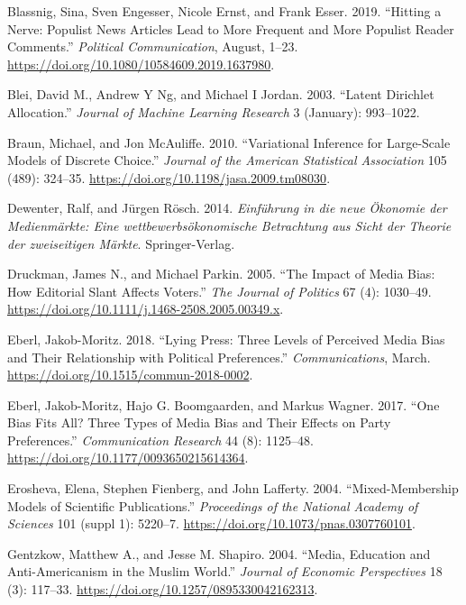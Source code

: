 \documentclass[
]{article}
\begin{document}
\leavevmode\hypertarget{ref-blassnig_hitting_2019}{}%
Blassnig, Sina, Sven Engesser, Nicole Ernst, and Frank Esser. 2019.
``Hitting a Nerve: Populist News Articles Lead to More Frequent and More
Populist Reader Comments.'' \emph{Political Communication}, August,
1--23. \url{https://doi.org/10.1080/10584609.2019.1637980}.

\leavevmode\hypertarget{ref-blei_latent_2003}{}%
Blei, David M., Andrew Y Ng, and Michael I Jordan. 2003. ``Latent
Dirichlet Allocation.'' \emph{Journal of Machine Learning Research} 3
(January): 993--1022.

\leavevmode\hypertarget{ref-braun_variational_2010}{}%
Braun, Michael, and Jon McAuliffe. 2010. ``Variational Inference for
Large-Scale Models of Discrete Choice.'' \emph{Journal of the American
Statistical Association} 105 (489): 324--35.
\url{https://doi.org/10.1198/jasa.2009.tm08030}.

\leavevmode\hypertarget{ref-dewenter_einfuhrung_2014}{}%
Dewenter, Ralf, and Jürgen Rösch. 2014. \emph{Einführung in die neue
Ökonomie der Medienmärkte: Eine wettbewerbsökonomische Betrachtung aus
Sicht der Theorie der zweiseitigen Märkte}. Springer-Verlag.

\leavevmode\hypertarget{ref-druckman_impact_2005}{}%
Druckman, James N., and Michael Parkin. 2005. ``The Impact of Media
Bias: How Editorial Slant Affects Voters.'' \emph{The Journal of
Politics} 67 (4): 1030--49.
\url{https://doi.org/10.1111/j.1468-2508.2005.00349.x}.

\leavevmode\hypertarget{ref-eberl_lying_2018}{}%
Eberl, Jakob-Moritz. 2018. ``Lying Press: Three Levels of Perceived
Media Bias and Their Relationship with Political Preferences.''
\emph{Communications}, March.
\url{https://doi.org/10.1515/commun-2018-0002}.

\leavevmode\hypertarget{ref-eberl_one_2017}{}%
Eberl, Jakob-Moritz, Hajo G. Boomgaarden, and Markus Wagner. 2017. ``One
Bias Fits All? Three Types of Media Bias and Their Effects on Party
Preferences.'' \emph{Communication Research} 44 (8): 1125--48.
\url{https://doi.org/10.1177/0093650215614364}.

\leavevmode\hypertarget{ref-erosheva_mixed-membership_2004}{}%
Erosheva, Elena, Stephen Fienberg, and John Lafferty. 2004.
``Mixed-Membership Models of Scientific Publications.''
\emph{Proceedings of the National Academy of Sciences} 101 (suppl 1):
5220--7. \url{https://doi.org/10.1073/pnas.0307760101}.

\leavevmode\hypertarget{ref-gentzkow_media_2004}{}%
Gentzkow, Matthew A., and Jesse M. Shapiro. 2004. ``Media, Education and
Anti-Americanism in the Muslim World.'' \emph{Journal of Economic
Perspectives} 18 (3): 117--33.
\url{https://doi.org/10.1257/0895330042162313}.
\end{document}
